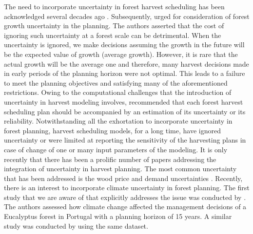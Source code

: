 \documentclass[forests,article,submit,moreauthors,pdftex]{Definitions/mdpi}
\begin{document}
The need to incorporate uncertainty in forest harvest scheduling has been acknowledged  several decades ago \citep{Dixon1980}.  Subsequently, \cite{VanKooten1992} urged for consideration of forest growth uncertainty in the planning. The authors asserted that the cost of ignoring such uncertainty at a forest scale can be detrimental.  When the uncertainty is ignored, we make decisions assuming the growth in the future will be the expected value of growth (average growth). However, it is rare that the actual growth will be the average one and therefore, many harvest decisions made in early periods of the planning horizon were not optimal. This leads to a failure to meet the planning objectives and satisfying many of the aforementioned  restrictions.
Owing to the computational challenges that the introduction of uncertainty in harvest modeling involves,  \cite{Pukkala1998}  recommended that each forest harvest scheduling plan should be accompanied by an estimation  of its uncertainty or its reliability. 
Notwithstanding all the exhortation to incorporate uncertainty in forest planning, harvest scheduling models, for a long time, have ignored uncertainty or were limited at reporting the sensitivity of the harvesting plans in case of change of one or many  input parameters of the modeling.
It is only recently that there has been a prolific number of papers addressing the integration of uncertainty in harvest planning. The most common uncertainty that has been addressed is the wood price and  demand uncertainties \citep{Alonso-Ayuso2011a, Veliz2014,Piazza2014, Pagnoncelli2017, Alonso-Ayuso2018}. Recently, there is an interest to incorporate climate uncertainty in forest planning. The first study that we are aware of that explicitly addresses the issue was conducted by \cite{Garcia-Gonzalo2016}. The authors assessed how climate change affected the management decisions of a Eucalyptus forest in Portugal with a planning horizon of 15 years. 
A similar study was conducted  by \cite{Alvarez-Miranda2018, Garcia-Gonzalo2020} using the same dataset.
\end{document}
